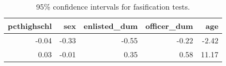 
\begin{longtable}[t]{rrrrr}
\caption{\label{tab:ci-tbl-lr-2}95\% confidence intervals for fasification tests.}\\
\toprule
pcthighschl & sex & enlisted\_dum & officer\_dum & age\\
\midrule
-0.04 & -0.33 & -0.55 & -0.22 & -2.42\\
0.03 & -0.01 & 0.35 & 0.58 & 11.17\\
\bottomrule
\end{longtable}
